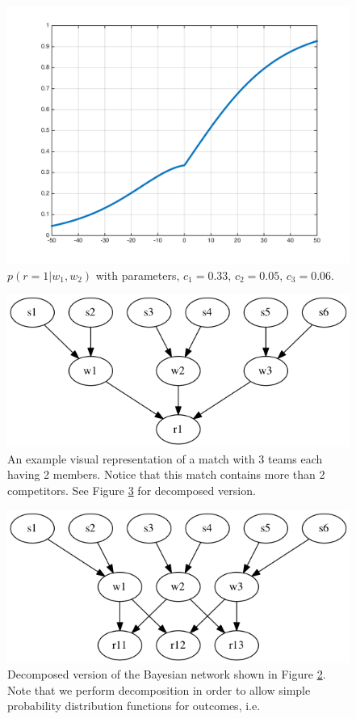 \documentclass[12pt]{article}
\begin{document}
\begin{itemize}
	\begin{figure}[!ht]
		\centering
		\includegraphics[width=0.9\columnwidth]{sigmo_2}
		\caption{$p(r = 1 | w_1, w_2)$ with parameters, $c_1 = 0.33$, $c_2 = 0.05$, $c_3 = 0.06$.}
		\label{sigmo_2}
	\end{figure}
	
	
	
	\begin{figure}[!ht]
		\centering
		\includegraphics[width=0.7\columnwidth]{baynet_1}
		\caption{An example visual representation of a match with 3 teams each having 2 members. Notice that this match contains more than 2 competitors. See Figure \ref{baynet_2} for decomposed version.}
		\label{baynet_1}
	\end{figure}
	
	\begin{figure}[!ht]
		\centering
		\includegraphics[width=0.7\columnwidth]{baynet_2}
		\caption{Decomposed version of the Bayesian network shown in Figure \ref{baynet_1}. Note that we perform decomposition in order to allow simple probability distribution functions for outcomes, i.e. }
		\label{baynet_2}
	\end{figure}


\end{itemize}
\end{document}
